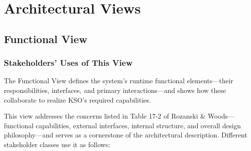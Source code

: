 \chapter{Architectural Views} \label{ArchitecturalViews}

\section{Functional View}

\subsection{Stakeholders’ Uses of This View}

The Functional View defines the system’s runtime functional elements—their responsibilities, interfaces, and primary interactions—and shows how these collaborate to realize KSO’s required capabilities.

This view addresses the concerns listed in Table 17-2 of Rozanski \& Woods—functional capabilities, external interfaces, internal structure, and overall design philosophy—and serves as a cornerstone of the architectural description. Different stakeholder classes use it as follows:

